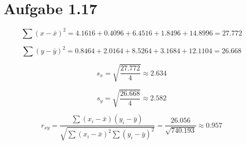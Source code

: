 \documentclass{article}
\begin{document}
		\section*{Aufgabe 1.17}
			\[
			\sum (x - \bar{x})^2 = 4.1616 + 0.4096 + 6.4516 + 1.8496 + 14.8996 = 27.772
			\]
			
			\[
			\sum (y - \bar{y})^2 = 0.8464 + 2.0164 + 8.5264 + 3.1684 + 12.1104 = 26.668
			\]
			
			\[
			s_{x}=\sqrt{\frac{27.772}{4}}\approx2.634
			\]
			
			\[
			s_{y}=\sqrt{\frac{26.668}{4}}\approx2.582
			\]
			
			\[
			r_{xy}=\frac{\sum(x_{i} - \bar{x})(y_{i} - \bar{y})}{\sqrt{\sum(x_{i} - \bar{x})^2\sum(y_{i} - \bar{y})^2}}=\frac{26.056}{\sqrt{740.193}}\approx0.957
			\]
\end{document}
